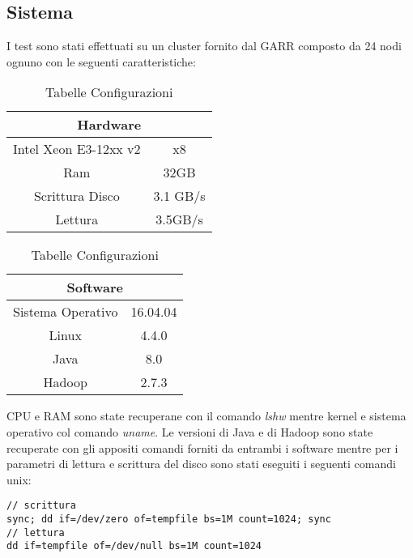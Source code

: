 \subsection{Sistema}
I test sono stati effettuati su un cluster fornito dal GARR composto da 24 nodi ognuno con le seguenti caratteristiche:
\begin{table}[H]
	\begin{tabular}{|c|c|}
		\hline
		\multicolumn{2}{|c|}{\textbf{Hardware}} \\
		\hline
		Intel Xeon E3-12xx v2 & x8              \\
		\hline
		Ram                   & 32GB            \\
		\hline
		Scrittura Disco       & 3.1 GB/s        \\
		\hline
		Lettura               & 3.5GB/s         \\
		\hline
	\end{tabular}
	\hfill
	\begin{tabular}{|c|c|}
		\hline
		\multicolumn{2}{|c|}{\textbf{Software}} \\
		\hline
		Sistema Operativo & 16.04.04            \\
		\hline
		Linux             & 4.4.0               \\
		\hline
		Java              & 8.0                 \\
		\hline
		Hadoop            & 2.7.3               \\
		\hline
	\end{tabular}
	\caption{Tabelle Configurazioni}
\end{table}
CPU e RAM sono state recuperane con il comando \textit{lshw} mentre kernel e sistema operativo col comando \textit{uname}. Le versioni di Java e di Hadoop sono state recuperate con gli appositi comandi forniti da entrambi i software mentre per i parametri di lettura e scrittura del disco sono stati eseguiti i seguenti comandi unix:
\begin{lstlisting}
// scrittura
sync; dd if=/dev/zero of=tempfile bs=1M count=1024; sync
// lettura
dd if=tempfile of=/dev/null bs=1M count=1024
\end{lstlisting}
